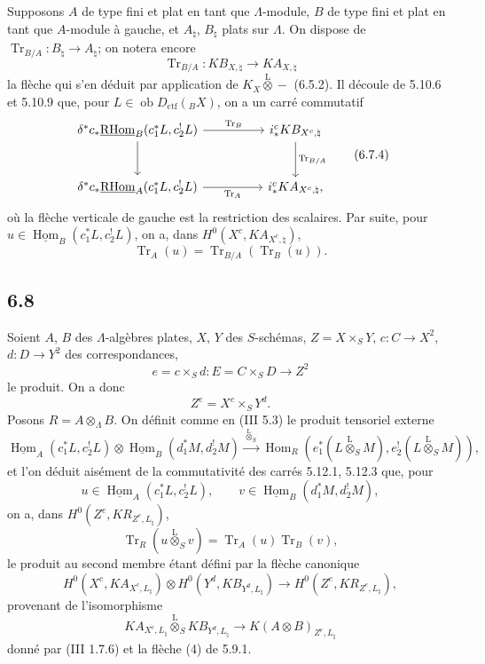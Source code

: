 \documentclass[11pt]{article}
\DeclareMathOperator{\Hom}{Hom}
\providecommand{\RHom}{\mathrm{RHom}}
\providecommand{\uRHom}{\underline{\RHom}}
\providecommand{\uHom}{\underline{\Hom}}
\providecommand{\Tr}{\operatorname{Tr}}
\providecommand{\Tr}{\operatorname{Tr}}
\providecommand{\lten}{\overset{\mathrm L}{\otimes}}
\providecommand{\Ob}{\operatorname{ob}}
\providecommand{\Tr}{\operatorname{Tr}}
\providecommand{\RHom}{\mathrm{RHom}}
\providecommand{\Hom}{\operatorname{Hom}}
\providecommand{\lten}{\overset{\mathrm L}{\otimes}}
\providecommand{\RHom}{\mathrm R\mathcal{H}om}
\providecommand{\lten}{\overset{\mathrm L}{\otimes}}
\providecommand{\Ob}{\operatorname{ob}}
\providecommand{\Tr}{\operatorname{Tr}}
\providecommand{\lten}{\overset{\mathrm L}{\otimes}}
\providecommand{\lten}{\overset{\mathrm L}{\otimes}}
\providecommand{\Ob}{\operatorname{Ob}}
\providecommand{\lten}{\overset{\mathrm L}{\otimes}}
\providecommand{\RHom}{\mathrm{RHom}}
\providecommand{\Hom}{\operatorname{Hom}}
\providecommand{\Tr}{\operatorname{Tr}}
\providecommand{\Ob}{\operatorname{ob}}
\providecommand{\Ob}{\operatorname{Ob}}
\providecommand{\lten}{\overset{\mathrm L}{\otimes}}
\begin{document}
Supposons $A$ de type fini et plat en tant que $\Lambda$-module, $B$ de type fini et plat en tant que $A$-module à gauche, et $A_{\natural}$, $B_{\natural}$ plats sur $\Lambda$. On dispose de $\Tr_{B/A}:B_{\natural}\to A_{\natural}$; on notera encore
\begin{equation}
\Tr_{B/A}:KB_{X,\natural}\longrightarrow KA_{X,\natural}
\tag{6.7.3}
\end{equation}
la flèche qui s'en déduit par application de $K_X\lten -$ (6.5.2). Il découle de 5.10.6 et 5.10.9 que, pour $L\in\Ob D_{\mathrm{ctf}}({}_BX)$, on a un carré commutatif
\begin{equation}
\begin{tikzcd}[column sep=huge,row sep=large]
\delta^*c_*\uRHom_B(c_1^*L,c_2^!L) \arrow[r,"\Tr_B"] \arrow[d]
& i_*^cKB_{X^c,\natural} \arrow[d,"\Tr_{B/A}"]\\
\delta^*c_*\uRHom_A(c_1^*L,c_2^!L) \arrow[r,"\Tr_A"']
& i_*^cKA_{X^c,\natural},
\end{tikzcd}
\tag{6.7.4}
\end{equation}
où la flèche verticale de gauche est la restriction des scalaires. Par suite, pour $u\in\uHom_B(c_1^*L,c_2^!L)$, on a, dans $H^0(X^c,KA_{X^c,\natural})$,
\begin{equation}
\Tr_A(u)=\Tr_{B/A}(\Tr_B(u)).
\tag{6.7.5}
\end{equation}

\subsection*{6.8}
Soient $A$, $B$ des $\Lambda$-algèbres plates, $X$, $Y$ des $S$-schémas, $Z=X\times_SY$, $c:C\to X^2$, $d:D\to Y^2$ des correspondances,
\[
e=c\times_Sd:E=C\times_SD\longrightarrow Z^2
\]
le produit. On a donc
\[
Z^e=X^c\times_SY^d.
\]
Posons $R=A\otimes_{\Lambda}B$. On définit comme en (III 5.3) le produit tensoriel externe
\begin{equation}
\uHom_A(c_1^*L,c_2^!L)\otimes \uHom_B(d_1^*M,d_2^!M)
\xrightarrow{\ \lten_S\ }
\Hom_R(e_1^*(L\lten_SM),e_2^!(L\lten_SM)),
\tag{6.8.1}
\end{equation}
et l'on déduit aisément de la commutativité des carrés 5.12.1, 5.12.3 que, pour
\[
u\in\uHom_A(c_1^*L,c_2^!L),\qquad v\in\uHom_B(d_1^*M,d_2^!M),
\]
on a, dans $H^0(Z^e,KR_{Z^e,L_{\natural}})$,
\begin{equation}
\Tr_R(u\lten_Sv)=\Tr_A(u)\Tr_B(v),
\tag{6.8.2}
\end{equation}
le produit au second membre étant défini par la flèche canonique
\begin{equation}
H^0(X^c,KA_{X^c,L_{\natural}})\otimes
H^0(Y^d,KB_{Y^d,L_{\natural}})
\longrightarrow
H^0(Z^e,KR_{Z^e,L_{\natural}}),
\tag{6.8.3}
\end{equation}
provenant de l'isomorphisme
\[
KA_{X^c,L_{\natural}}\lten_S KB_{Y^d,L_{\natural}}\longrightarrow K(A\otimes B)_{Z^e,L_{\natural}}
\]
donné par (III 1.7.6) et la flèche (4) de 5.9.1.
\end{document}
